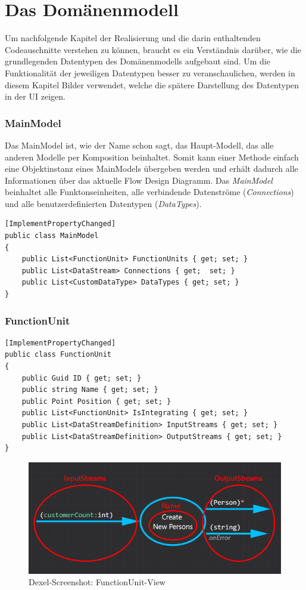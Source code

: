 \section{Das Domänenmodell}

Um nachfolgende Kapitel der Realisierung und die darin enthaltenden
Codeauschnitte verstehen zu können, braucht es ein Verständnis darüber, wie die
grundlegenden Datentypen des Domänenmodells aufgebaut sind. Um die Funktionalität der
jeweiligen Datentypen besser zu veranschaulichen, werden in diesem Kapitel
Bilder verwendet, welche die spätere Darstellung des Datentypen in der UI zeigen.

\subsubsection{MainModel}

Das MainModel ist, wie der Name schon sagt, das Haupt-Modell, das alle
anderen Modelle per Komposition beinhaltet. Somit kann einer Methode einfach eine Objektinstanz
eines MainModels übergeben werden und erhält dadurch alle Informationen über das aktuelle Flow Design Diagramm. 
Das \textit{MainModel} beinhaltet alle Funktonseinheiten, alle verbindende
Datenströme (\textit{Connections}) und alle benutzerdefinierten Datentypen (\textit{DataTypes}).

\begin{lstlisting}[caption=MainModel Klasse]
[ImplementPropertyChanged]
public class MainModel
{
	public List<FunctionUnit> FunctionUnits { get; set; }
	public List<DataStream> Connections { get;  set; }
	public List<CustomDataType> DataTypes { get; set; } 
}
\end{lstlisting}

\subsubsection{FunctionUnit}


\begin{lstlisting}[caption=FunctionUnit Klasse]
[ImplementPropertyChanged]
public class FunctionUnit
{
	public Guid ID { get; set; }
	public string Name { get; set; }
	public Point Position { get; set; }
	public List<FunctionUnit> IsIntegrating { get; set; }
	public List<DataStreamDefinition> InputStreams { get; set; }
	public List<DataStreamDefinition> OutputStreams { get; set; }
}
\end{lstlisting}

	
	\begin{figure}[H]
		\centering
		\includegraphics[width=0.9\linewidth]{./img/FunctionUnitView.png} 
		\caption{Dexel-Screenshot: FunctionUnit-View}
	\end{figure}


